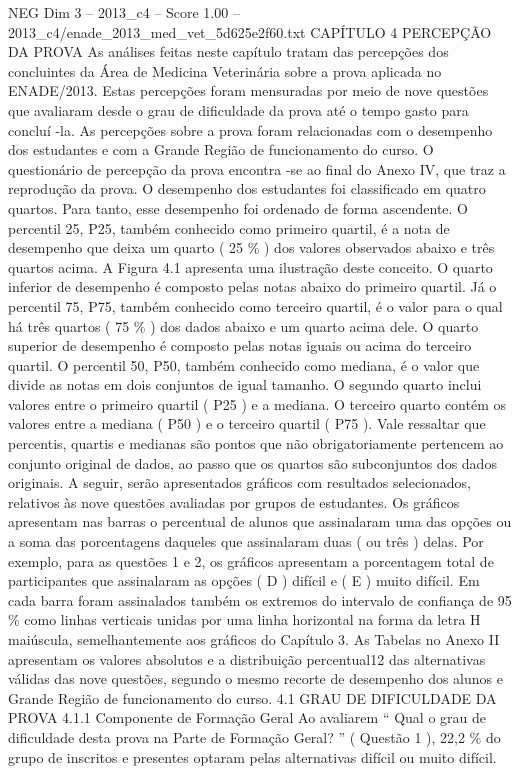 \begin{textsample}{NEG Dim 3 – 2013\_c4 – Score 1.00 – 2013\_c4/enade\_2013\_med\_vet\_5d625e2f60.txt}  \label{ex:f3_neg_137}
CAPÍTULO 4 PERCEPÇÃO DA PROVA As análises feitas neste capítulo tratam das percepções dos concluintes da Área de Medicina Veterinária sobre a prova aplicada no ENADE/2013.
Estas percepções foram mensuradas por meio de nove questões que avaliaram desde o grau de dificuldade da prova até o tempo gasto para concluí -la.
As percepções sobre a prova foram relacionadas com o desempenho dos estudantes e com a Grande Região de funcionamento do curso.
O questionário de percepção da prova encontra -se ao final do Anexo IV, que traz a reprodução da prova.
O desempenho dos estudantes foi classificado em quatro quartos.
Para tanto, esse desempenho foi ordenado de forma ascendente.
O percentil 25, P25, também conhecido como primeiro quartil, é a nota de desempenho que deixa um quarto ( 25 \% ) dos valores observados abaixo e três quartos acima.
A Figura 4.1 apresenta uma ilustração deste conceito.
O quarto inferior de desempenho é composto pelas notas abaixo do primeiro quartil.
Já o percentil 75, P75, também conhecido como terceiro quartil, é o valor para o qual há três quartos ( 75 \% ) dos dados abaixo e um quarto acima dele.
O quarto superior de desempenho é composto pelas notas iguais ou acima do terceiro quartil.
O percentil 50, P50, também conhecido como mediana, é o valor que divide as notas em dois conjuntos de igual tamanho.
O segundo quarto inclui valores entre o primeiro quartil ( P25 ) e a mediana.
O terceiro quarto contém os valores entre a mediana ( P50 ) e o terceiro quartil ( P75 ).
Vale ressaltar que percentis, quartis e medianas são pontos que não obrigatoriamente pertencem ao conjunto original de dados, ao passo que os quartos são subconjuntos dos dados originais.
A seguir, serão apresentados gráficos com resultados selecionados, relativos às nove questões avaliadas por grupos de estudantes.
Os gráficos apresentam nas barras o percentual de alunos que assinalaram uma das opções ou a soma das porcentagens daqueles que assinalaram duas ( ou três ) delas.
Por exemplo, para as questões 1 e 2, os gráficos apresentam a porcentagem total de participantes que assinalaram as opções ( D ) difícil e ( E ) muito difícil.
Em cada barra foram assinalados também os extremos do intervalo de confiança de 95 \% como linhas verticais unidas por uma linha horizontal na forma da letra H maiúscula, semelhantemente aos gráficos do Capítulo 3.
As Tabelas no Anexo II apresentam os valores absolutos e a distribuição percentual12 das alternativas válidas das nove questões, segundo o mesmo recorte de desempenho dos alunos e Grande Região de funcionamento do curso. 4.1 GRAU DE DIFICULDADE DA PROVA 4.1.1 Componente de Formação Geral Ao avaliarem “ Qual o grau de dificuldade desta prova na Parte de Formação Geral? ” ( Questão 1 ), 22,2 \% do grupo de inscritos e presentes optaram pelas alternativas difícil ou muito difícil.

\end{textsample}
